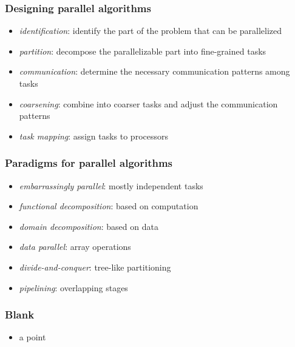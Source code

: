 \begin{frame}[fragile]
%
  \frametitle{Designing parallel algorithms}
%
  \begin{itemize}
%
  \item {\em identification}: identify the part of the problem that can be parallelized
  \item {\em partition}: decompose the parallelizable part into fine-grained tasks
  \item {\em communication}: determine the necessary communication patterns among tasks
  \item {\em coarsening}: combine into coarser tasks and adjust the communication patterns
  \item {\em task mapping}: assign tasks to processors
%
  \end{itemize}
%
\end{frame}

\begin{frame}[fragile]
%
  \frametitle{Paradigms for parallel algorithms}
%
  \begin{itemize}
%
  \item {\em embarrassingly parallel}: mostly independent tasks
  \item {\em functional decomposition}: based on computation
  \item {\em domain decomposition}: based on data
  \item {\em data parallel}: array operations
  \item {\em divide-and-conquer}: tree-like partitioning
  \item {\em pipelining}: overlapping stages
%
  \end{itemize}
%
\end{frame}

\begin{frame}[fragile]
%
  \frametitle{Blank}
%
  \begin{itemize}
%
  \item a point
%
  \end{itemize}
%
\end{frame}

